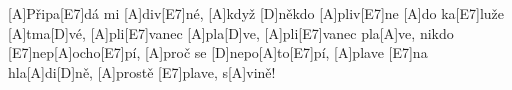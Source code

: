
[A]Připa[E7]dá mi [A]div[E7]né, [A] když [D]někdo [A]pliv[E7]ne
[A]do ka[E7]luže [A]tma[D]vé, [A] pli[E7]vanec [A]pla[D]ve,
[A] pli[E7]vanec pla[A]ve,
nikdo [E7]nep[A]ocho[E7]pí, [A]proč se [D]nepo[A]to[E7]pí,
[A]plave [E7]na hla[A]di[D]ně, [A]prostě [E7]plave, s[A]vině!